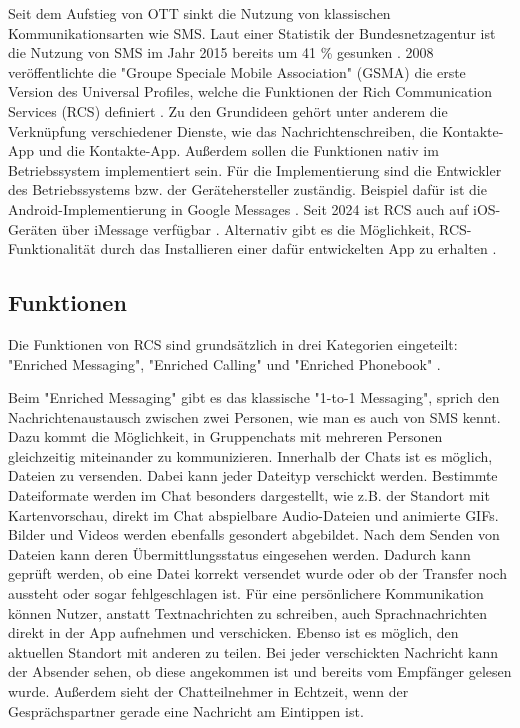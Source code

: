 \documentclass[conference]{IEEEtran}
\begin{document}
Seit dem Aufstieg von OTT sinkt die Nutzung von klassischen Kommunikationsarten wie SMS.
Laut einer Statistik der Bundesnetzagentur ist die Nutzung von SMS im Jahr 2015 bereits um 41 \% gesunken \cite{ottmobinter}.
2008 veröffentlichte die "Groupe Speciale Mobile Association" (GSMA) die erste Version des Universal Profiles, welche die Funktionen der Rich Communication Services (RCS) definiert \cite{rcsuite}.
Zu den Grundideen gehört unter anderem die Verknüpfung verschiedener Dienste, wie das Nachrichtenschreiben, die Kontakte-App und die Kontakte-App.
Außerdem sollen die Funktionen nativ im Betriebssystem implementiert sein.
Für die Implementierung sind die Entwickler des Betriebssystems bzw. der Gerätehersteller zuständig.
Beispiel dafür ist die Android-Implementierung in Google Messages \cite{googlemessages}.
Seit 2024 ist RCS auch auf iOS-Geräten über iMessage verfügbar \cite{applemessages}.
Alternativ gibt es die Möglichkeit, RCS-Funktionalität durch das Installieren einer dafür entwickelten App zu erhalten \cite{uniprof}.

\subsection{Funktionen}

Die Funktionen von RCS sind grundsätzlich in drei Kategorien eingeteilt: "Enriched Messaging", "Enriched Calling" und "Enriched Phonebook" \cite{rcsuite,uniprof}.

Beim "Enriched Messaging" gibt es das klassische "1-to-1 Messaging", sprich den Nachrichtenaustausch zwischen zwei Personen, wie man es auch von SMS kennt.
Dazu kommt die Möglichkeit, in Gruppenchats mit mehreren Personen gleichzeitig miteinander zu kommunizieren.
Innerhalb der Chats ist es möglich, Dateien zu versenden.
Dabei kann jeder Dateityp verschickt werden. Bestimmte Dateiformate werden im Chat besonders dargestellt, wie z.B. der Standort mit Kartenvorschau, direkt im Chat abspielbare Audio-Dateien und animierte GIFs.
Bilder und Videos werden ebenfalls gesondert abgebildet.
Nach dem Senden von Dateien kann deren Übermittlungsstatus eingesehen werden.
Dadurch kann geprüft werden, ob eine Datei korrekt versendet wurde oder ob der Transfer noch aussteht oder sogar fehlgeschlagen ist.
Für eine persönlichere Kommunikation können Nutzer, anstatt Textnachrichten zu schreiben, auch Sprachnachrichten direkt in der App aufnehmen und verschicken.
Ebenso ist es möglich, den aktuellen Standort mit anderen zu teilen.
Bei jeder verschickten Nachricht kann der Absender sehen, ob diese angekommen ist und bereits vom Empfänger gelesen wurde.
Außerdem sieht der Chatteilnehmer in Echtzeit, wenn der Gesprächspartner gerade eine Nachricht am Eintippen ist.
\end{document}
